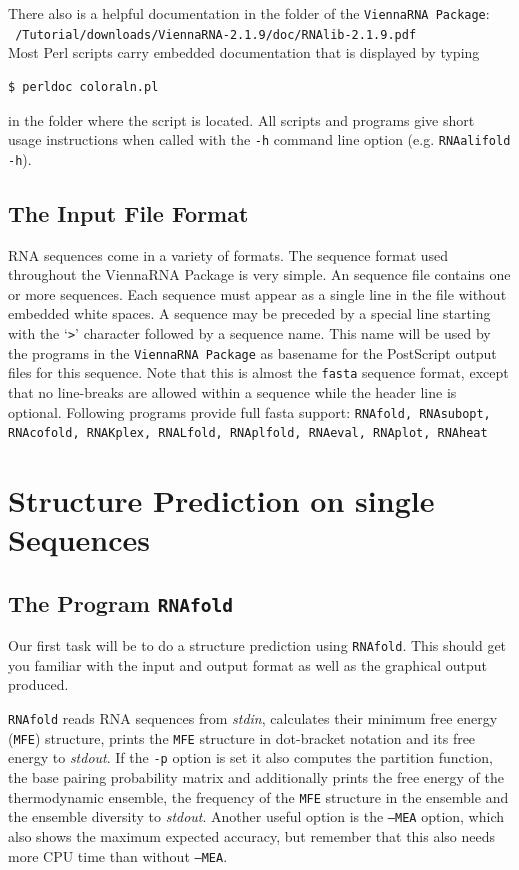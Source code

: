 \documentclass[a4paper]{article}
\begin{document}
There also is a helpful documentation in the folder of the \texttt{ViennaRNA Package}:\\
\texttt{~/Tutorial/downloads/ViennaRNA-2.1.9/doc/RNAlib-2.1.9.pdf}\\

Most Perl scripts carry embedded documentation that is displayed by typing 
\begin{verbatim}
$ perldoc coloraln.pl
\end{verbatim}%
in the folder where the script is located.
All scripts and programs give short usage instructions when called with
the \texttt{-h} command line option (e.g. \texttt{RNAalifold -h}).

\subsection{The Input File Format}
RNA sequences come in a variety of formats. The sequence format used
throughout the ViennaRNA Package is very simple. An sequence
file contains one or more sequences. Each sequence must appear as a
single line in the file without embedded white spaces. A sequence may
be preceded by a special line starting with the `\texttt{>}' character
followed by a sequence name. This name will be used by the programs in
the \texttt{ViennaRNA Package} as basename for the PostScript output
files for this sequence. Note that this is almost the \texttt{fasta}
sequence format, except that no line-breaks are allowed within a sequence
while the header line is optional. Following programs provide full 
fasta support: \texttt{RNAfold, RNAsubopt, RNAcofold, RNAKplex, RNALfold, 
RNAplfold, RNAeval, RNAplot, RNAheat}

%
\section{Structure Prediction on single Sequences}
\subsection{The Program \texttt{RNAfold}}
Our first task will be to do a structure prediction using
\texttt{RNAfold}. This should get you familiar with the input and output
format as well as the graphical output produced.

\texttt{RNAfold} reads RNA sequences from \textit{stdin}, calculates their
minimum free energy (\texttt{MFE}) structure, prints the \texttt{MFE} structure in 
dot-bracket notation and its free energy to \textit{stdout}. If the
\texttt{-p} option is set it also computes the partition function, the base pairing 
probability matrix and additionally prints the free energy of the
thermodynamic ensemble, the frequency of the \texttt{MFE} structure in the
ensemble and the ensemble diversity to \textit{stdout}. Another useful option is the
\texttt{--MEA} option, which also shows the maximum expected accuracy, but remember that
this also needs more CPU time than without \texttt{--MEA}.
\end{document}

